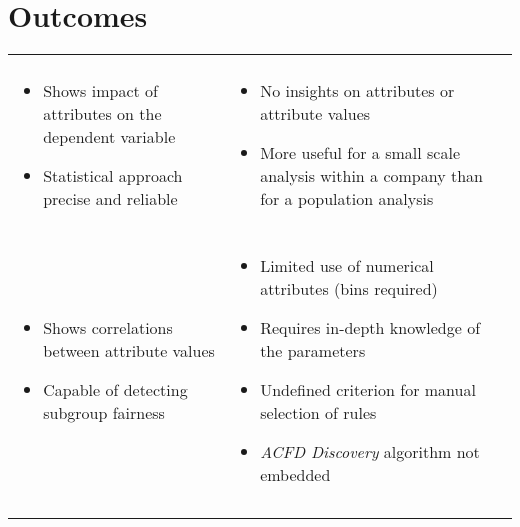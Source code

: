 \section{Outcomes}
\label{section:outcomes}
\begin{table}[t!]
\begin{tabularx}{\columnwidth}{|>{\RaggedRight\arraybackslash}Y>{\RaggedRight\arraybackslash}Y|}
\hline
{} & \\
\hline
{}\\
\hline
\begin{itemize}[noitemsep,topsep=0pt,parsep=0pt,partopsep=0pt,leftmargin=*]
\item Shows impact of attributes on the dependent variable
\item Statistical approach precise and reliable
\end{itemize} & \begin{itemize}[noitemsep,topsep=0pt,parsep=0pt,partopsep=0pt,leftmargin=*]
\item No insights on attributes or attribute values
\item More useful for a small scale analysis within a company than for a population analysis
\end{itemize}\\
\hline
{}\\
\hline
\begin{itemize}[noitemsep,topsep=0pt,parsep=0pt,partopsep=0pt,leftmargin=*]
\item Shows correlations between attribute values
\item Capable of detecting subgroup fairness
\end{itemize} & \begin{itemize}[noitemsep,topsep=0pt,parsep=0pt,partopsep=0pt,leftmargin=*]
\item Limited use of numerical attributes (bins required)
\item Requires in-depth knowledge of the parameters
\item Undefined criterion for manual selection of rules
\item \textit{ACFD Discovery} algorithm not embedded
\end{itemize}\\
\hline
{}\\
\hline
\begin{itemize}[noitemsep,topsep=0pt,parsep=0pt,partopsep=0pt,leftmargin=*]

\end{itemize}
\end{tabularx}
\end{table}
